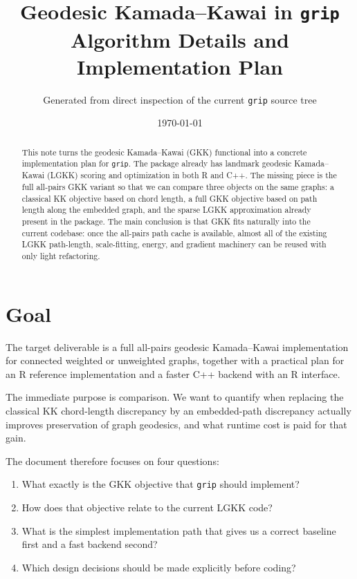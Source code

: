 \documentclass[11pt]{article}
\title{Geodesic Kamada--Kawai in \texttt{grip}\\
\large Algorithm Details and Implementation Plan}
\author{Generated from direct inspection of the current \texttt{grip} source tree}
\date{\today}
\begin{document}
\maketitle

\begin{abstract}
This note turns the geodesic Kamada--Kawai (GKK) functional into a concrete
implementation plan for \texttt{grip}. The package already has landmark geodesic
Kamada--Kawai (LGKK) scoring and optimization in both R and C++. The missing
piece is the full all-pairs GKK variant so that we can compare three objects on
the same graphs: a classical KK objective based on chord length, a full GKK
objective based on path length along the embedded graph, and the sparse LGKK
approximation already present in the package. The main conclusion is that GKK
fits naturally into the current codebase: once the all-pairs path cache is
available, almost all of the existing LGKK path-length, scale-fitting, energy,
and gradient machinery can be reused with only light refactoring.
\end{abstract}

\section{Goal}

The target deliverable is a full all-pairs geodesic Kamada--Kawai implementation
for connected weighted or unweighted graphs, together with a practical plan for
an R reference implementation and a faster C++ backend with an R interface.

The immediate purpose is comparison. We want to quantify when replacing the
classical KK chord-length discrepancy by an embedded-path discrepancy actually
improves preservation of graph geodesics, and what runtime cost is paid for that
gain.

The document therefore focuses on four questions:
\begin{enumerate}[leftmargin=1.5em]
\item What exactly is the GKK objective that \texttt{grip} should implement?
\item How does that objective relate to the current LGKK code?
\item What is the simplest implementation path that gives us a correct baseline
first and a fast backend second?
\item Which design decisions should be made explicitly before coding?
\end{enumerate}
\end{document}
